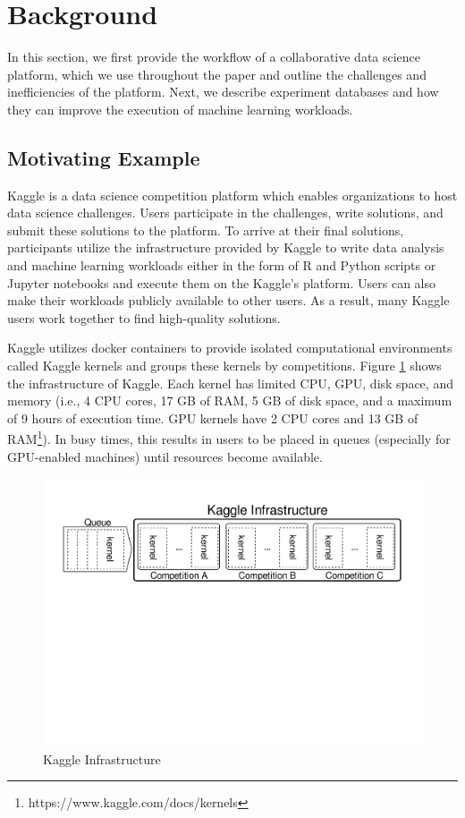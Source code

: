 \section{Background} \label{sec-background}
In this section, we first provide the workflow of a collaborative data science platform, which we use throughout the paper and outline the challenges and inefficiencies of the platform.
Next, we describe experiment databases and how they can improve the execution of machine learning workloads.

\subsection{Motivating Example}\label{subsec-motivational-example}
Kaggle is a data science competition platform which enables organizations to host data science challenges.
Users participate in the challenges, write solutions, and submit these solutions to the platform.
To arrive at their final solutions, participants utilize the infrastructure provided by Kaggle to write data analysis and machine learning workloads either in the form of R and Python scripts  or Jupyter notebooks  and execute them on the Kaggle's platform.
Users can also make their workloads publicly available to other users.
As a result, many Kaggle users work together to find high-quality solutions.

Kaggle utilizes docker containers to provide isolated computational environments called Kaggle kernels and groups these kernels by competitions.
Figure \ref{example-use-case} shows the infrastructure of Kaggle.
Each kernel has limited CPU, GPU, disk space, and memory (i.e., 4 CPU cores, 17 GB of RAM, 5 GB of disk space, and a maximum of 9 hours of execution time. GPU kernels have 2 CPU cores and 13 GB of RAM\footnote{https://www.kaggle.com/docs/kernels}).
In busy times, this results in users to be placed in queues (especially for GPU-enabled machines) until resources become available.

\begin{figure}
\centering
\includegraphics[width=\columnwidth]{../images/example-use-case}
\caption{Kaggle Infrastructure}
\label{example-use-case}
\end{figure}


